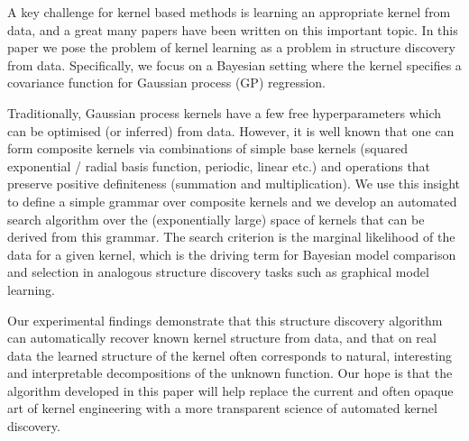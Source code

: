 \documentclass[twoside]{article}
\begin{document}
A key challenge for kernel based methods is learning an appropriate kernel from data, and a great many papers have been written on this important topic.
In this paper we pose the problem of kernel learning as a problem in structure discovery from data.
Specifically, we focus on a Bayesian setting where the kernel specifies a covariance function for Gaussian process (GP) regression.

Traditionally, Gaussian process kernels have a few free hyperparameters which can be optimised (or inferred) from data.
However, it is well known that one can form composite kernels via combinations of simple base kernels (\eg squared exponential / radial basis function, periodic, linear etc.) and operations that preserve positive definiteness (\eg summation and multiplication).
We use this insight to define a simple grammar over composite kernels and we develop an automated search algorithm over the (exponentially large) space of kernels that can be derived from this grammar.
The search criterion is the marginal likelihood of the data for a given kernel, which is the driving term for Bayesian model comparison and selection in analogous structure discovery tasks such as graphical model learning.

Our experimental findings demonstrate that this structure discovery algorithm can automatically recover known kernel structure from data, and that on real data the learned structure of the kernel often corresponds to natural, interesting and interpretable decompositions of the unknown function.
Our hope is that the algorithm developed in this paper will help replace the current and often opaque art of kernel engineering with a more transparent science of automated kernel discovery.


\end{document}
